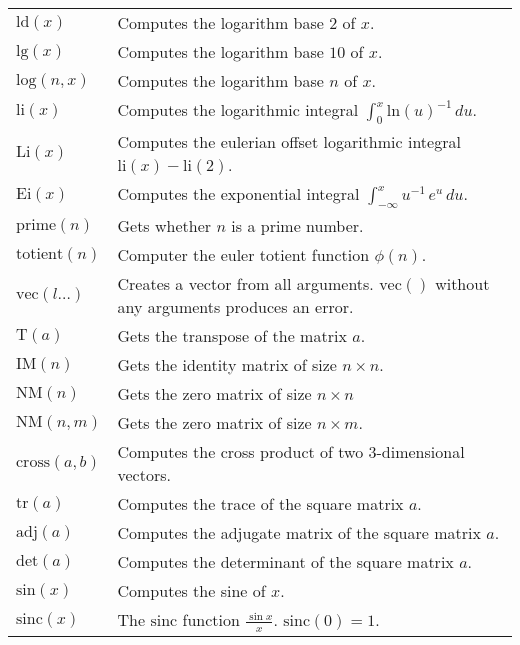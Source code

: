 \documentclass[10pt]{article}
\newcommand{\tabgap}{\vspace{3mm}\\}
\begin{document}
\begin{longtable}{p{}p{}}
        $ \mathrm{ld}(x) $                         & Computes the logarithm base $ 2 $ of $ x $. \\
        $ \mathrm{lg}(x) $                         & Computes the logarithm base $ 10 $ of $ x $. \\
        $ \mathrm{log}(n, x) $                     & Computes the logarithm base $ n $ of $ x $. \tabgap
        $ \mathrm{li}(x) $                         & Computes the logarithmic integral $ \int_0^x \mathrm{ln}(u)^{-1}\,du $. \\
        $ \mathrm{Li}(x) $                         & Computes the eulerian offset logarithmic integral $ \mathrm{li}(x) - \mathrm{li}(2) $. \\
        $ \mathrm{Ei}(x) $                         & Computes the exponential integral $ \int_{-\infty}^x u^{-1}\,e^u\,du $. \tabgap
        $ \mathrm{prime}(n) $                      & Gets whether $ n $ is a prime number. \\
        $ \mathrm{totient}(n) $                    & Computer the euler totient function $ \phi(n) $. \tabgap
        $ \mathrm{vec}(l\dots) $                   & Creates a vector from all arguments. $ \mathrm{vec}() $ without any arguments produces an error. \\
        $ \mathrm{T}(a) $                          & Gets the transpose of the matrix $ a $. \\
        $ \mathrm{IM}(n) $                         & Gets the identity matrix of size $ n\times n $. \\
        $ \mathrm{NM}(n) $                         & Gets the zero matrix of size $ n\times n $ \\
        $ \mathrm{NM}(n,m) $                       & Gets the zero matrix of size $ n\times m $. \\
        $ \mathrm{cross}(a, b) $                   & Computes the cross product of two $ 3 $-dimensional vectors. \\
        $ \mathrm{tr}(a) $                         & Computes the trace of the square matrix $ a $. \\
        $ \mathrm{adj}(a) $                        & Computes the adjugate matrix of the square matrix $ a $. \\
        $ \mathrm{det}(a) $                        & Computes the determinant of the square matrix $ a $. \tabgap
        $ \mathrm{sin}(x) $                        & Computes the sine of $ x $. \\
        $ \mathrm{sinc}(x) $                       & The $ \mathrm{sinc} $ function $ \frac{\sin x}{x} $. $ \mathrm{sinc}(0) = 1 $. \\

\end{longtable}
\end{document}
